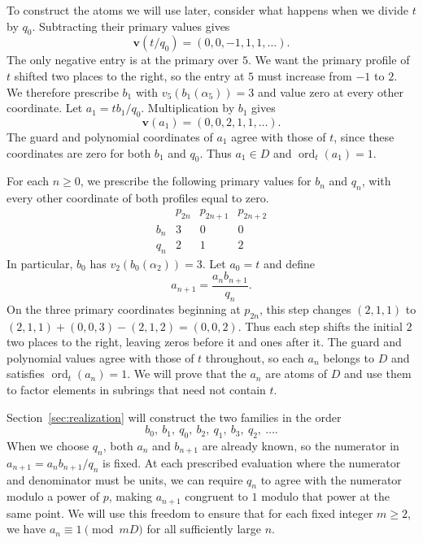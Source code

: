 \documentclass{article}
\DeclareMathOperator{\ord}{ord}
\theoremstyle{remark}
\begin{document}
To construct the atoms we will use later, consider what happens when we divide $t$ by $q_0$.
Subtracting their primary values gives
\[
    \mathbf{v}(t/q_0) = (0, 0, -1, 1, 1, \ldots).
\]
The only negative entry is at the primary over $5$.
We want the primary profile of $t$ shifted two places to the right, so the entry at $5$ must increase from $-1$ to $2$.
We therefore prescribe $b_1$ with $v_5(b_1(\alpha_5)) = 3$ and value zero at every other coordinate.
Let $a_1 = t b_1/q_0$.
Multiplication by $b_1$ gives
\[
    \mathbf{v}(a_1) = (0, 0, 2, 1, 1, \ldots).
\]
The guard and polynomial coordinates of $a_1$ agree with those of $t$, since these coordinates are zero for both $b_1$ and $q_0$.
Thus $a_1 \in D$ and $\ord_t(a_1) = 1$.

For each $n \ge 0$, we prescribe the following primary values for $b_n$ and $q_n$, with every other coordinate of both profiles equal to zero.
\begin{equation*}
    \tag{P}\label{eq:prescribed-profiles}
    \begin{array}{c|ccc}
        & p_{2n} & p_{2n + 1} & p_{2n + 2} \\
        \hline
        b_n & 3 & 0 & 0 \\
        q_n & 2 & 1 & 2
    \end{array}
\end{equation*}
In particular, $b_0$ has $v_2(b_0(\alpha_2)) = 3$.
Let $a_0 = t$ and define
\[
    a_{n + 1} = \frac{a_n b_{n + 1}}{q_n}.
\]
On the three primary coordinates beginning at $p_{2n}$, this step changes $(2, 1, 1)$ to $(2, 1, 1) + (0, 0, 3) - (2, 1, 2) = (0, 0, 2)$.
Thus each step shifts the initial $2$ two places to the right, leaving zeros before it and ones after it.
The guard and polynomial values agree with those of $t$ throughout, so each $a_n$ belongs to $D$ and satisfies $\ord_t(a_n) = 1$.
We will prove that the $a_n$ are atoms of $D$ and use them to factor elements in subrings that need not contain $t$.

Section~\ref{sec:realization} will construct the two families in the order
\[
    b_0,\ b_1,\ q_0,\ b_2,\ q_1,\ b_3,\ q_2,\ \ldots.
\]
When we choose $q_n$, both $a_n$ and $b_{n + 1}$ are already known, so the numerator in $a_{n + 1} = a_n b_{n + 1}/q_n$ is fixed.
At each prescribed evaluation where the numerator and denominator must be units, we can require $q_n$ to agree with the numerator modulo a power of $p$, making $a_{n + 1}$ congruent to $1$ modulo that power at the same point.
We will use this freedom to ensure that for each fixed integer $m \ge 2$, we have $a_n \equiv 1 \pmod{mD}$ for all sufficiently large $n$.
\end{document}
